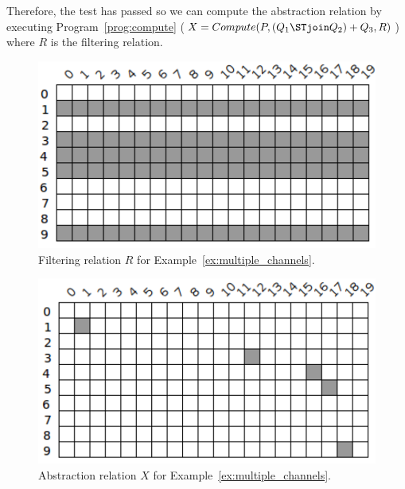 \begin{example}
	Therefore, the test has passed so we can compute the abstraction relation by executing Program~\ref{prog:compute} ($X = Compute(P,(Q_1 \STjoin Q_2) + Q_3,R)$) where $R$ is the filtering relation. \newline

	\begin{figure}[ht]
		\centering
		\includegraphics[scale=0.65]{Figures/PDF/Relview/R.pdf}
		\caption{Filtering relation $R$ for Example~\ref{ex:multiple_channels}.}
		\label{fig:multiple_channels_r}
	\end{figure}

	\begin{figure}[ht]
		\centering
		\includegraphics[scale=0.65]{Figures/PDF/Relview/XR.pdf}
		\caption{Abstraction relation $X$ for Example~\ref{ex:multiple_channels}.}
		\label{fig:multiple_channels_x}
	\end{figure}
	
	\newpage 
\end{example}
